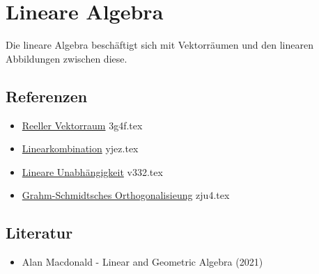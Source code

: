 \documentclass{sajzk}
\begin{document}
\section{Lineare Algebra} 
\label{jtfm}

Die lineare Algebra beschäftigt sich mit Vektorräumen und den linearen Abbildungen zwischen diese.

\subsection{Referenzen} 
\begin{itemize}
    \item \href{3g4f.pdf}{Reeller Vektorraum} 3g4f.tex
    \item \href{yjez.pdf}{Linearkombination} yjez.tex
    \item \href{v332.pdf}{Lineare Unabhängigkeit} v332.tex
    \item \href{zju4.pdf}{Grahm-Schmidtsches Orthogonalisieung} zju4.tex
\end{itemize}

\subsection{Literatur} 
\begin{itemize}
    \item Alan Macdonald - Linear and Geometric Algebra (2021)
\end{itemize}
\end{document}
